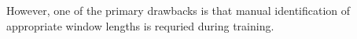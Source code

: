 \documentclass[conference]{IEEEtran}
\begin{document}
However, one of the primary drawbacks is that manual identification of appropriate window lengths is requried during training.









%
%







%
%
%

%
%

%






\end{document}
